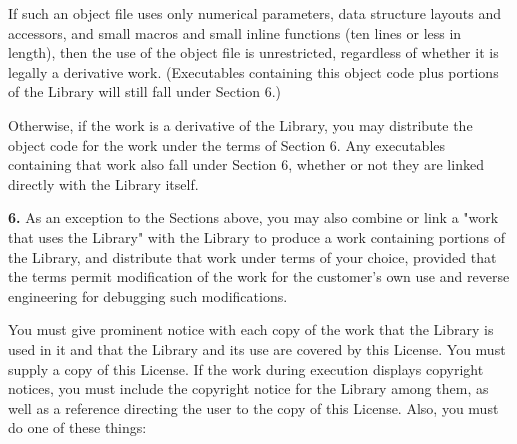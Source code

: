 If such an object file uses only numerical parameters, data structure layouts
and accessors, and small macros and small inline functions (ten lines or less
in length), then the use of the object file is unrestricted, regardless of
whether it is legally a derivative work. (Executables containing this object
code plus portions of the Library will still fall under Section 6.)

Otherwise, if the work is a derivative of the Library, you may distribute the
object code for the work under the terms of Section 6. Any executables
containing that work also fall under Section 6, whether or not they are linked
directly with the Library itself.

{\bf 6.} As an exception to the Sections above, you may also combine or link a
"work that uses the Library" with the Library to produce a work containing
portions of the Library, and distribute that work under terms of your choice,
provided that the terms permit modification of the work for the customer's own
use and reverse engineering for debugging such modifications.

You must give prominent notice with each copy of the work that the Library is
used in it and that the Library and its use are covered by this License. You
must supply a copy of this License. If the work during execution displays
copyright notices, you must include the copyright notice for the Library among
them, as well as a reference directing the user to the copy of this License.
Also, you must do one of these things:


